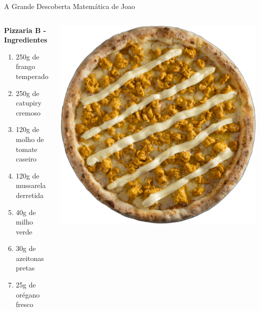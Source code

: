 \documentclass[12pt]{beamer}
\begin{document}
    \begin{frame}{A Grande Descoberta Matemática de Joao}
    
        \begin{columns}
        \begin{column}{0.6\textwidth}
       
            \textbf{Pizzaria B - Ingredientes}

            \begin{enumerate}
                \item 250g de frango temperado
                \item 250g de catupiry cremoso
                \item 120g de molho de tomate caseiro
                \item 120g de mussarela derretida
                \item 40g de milho verde
                \item 30g de azeitonas pretas
                \item 25g de orégano fresco
            \end{enumerate}
        \end{column}

        \begin{column}{0.4\textwidth}
            \centering
            \includegraphics[width=0.8\linewidth]{imagens/pizza_1.png}
        \end{column}
    \end{columns}
        
    \end{frame}
    
\end{document}
